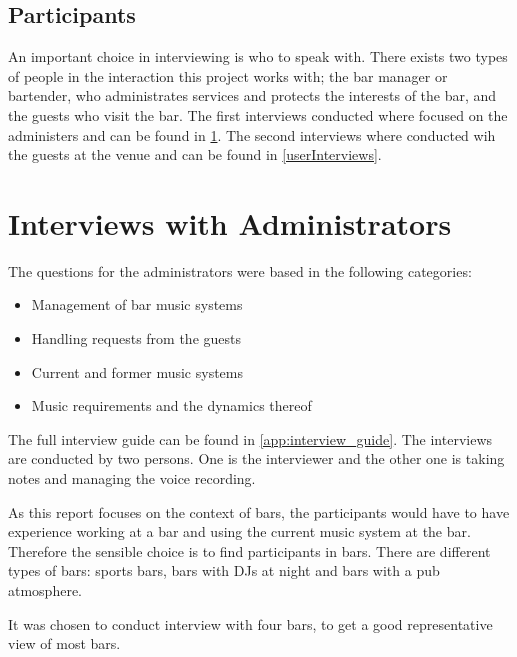 \subsection{Participants}
An important choice in interviewing is who to speak with. There exists two types of people in the interaction this project works with; the bar manager or bartender, who administrates services and protects the interests of the bar, and the guests who visit the bar. The first interviews conducted where focused on the administers and can be found in \cref{sub:administersinterviews}. The second interviews where conducted wih the guests at the venue and can be found in \cref{userInterviews}.

\section{Interviews with Administrators}
\label{sub:administersinterviews}
The questions for the administrators were based in the following categories:

\begin{itemize}
  \item Management of bar music systems
  \item Handling requests from the guests
  \item Current and former music systems
  \item Music requirements and the dynamics thereof
\end{itemize}

The full interview guide can be found in \cref{app:interview_guide}. The interviews are conducted by two persons. One is the interviewer and the other one is taking notes and managing the voice recording. 

As this report focuses on the context of bars, the participants would have to have experience working at a bar and using the current music system at the bar. Therefore the sensible choice is to find participants in bars. There are different types of bars: sports bars, bars with DJs at night and bars with a pub atmosphere.

It was chosen to conduct interview with four bars, to get a good representative view of most bars.


